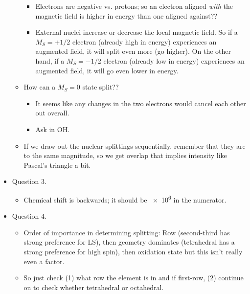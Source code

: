 \documentclass[../notes.tex]{subfiles}
\begin{document}
\begin{itemize}
\begin{itemize}
\begin{itemize}
            \item Electrons are negative vs. protons; so an electron aligned \emph{with} the magnetic field is higher in energy than one aligned against??
            \item External nuclei increase or decrease the local magnetic field. So if a $M_S=+1/2$ electron (already high in energy) experiences an augmented field, it will split even more (go higher). On the other hand, if a $M_S=-1/2$ electron (already low in energy) experiences an augmented field, it will go even lower in energy.
        \end{itemize}
        \item How can a $M_S=0$ state split??
        \begin{itemize}
            \item It seems like any changes in the two electrons would cancel each other out overall.
            \item Ask in OH.
        \end{itemize}
        \item If we draw out the nuclear splittings sequentially, remember that they are to the same magnitude, so we get overlap that implies intensity like Pascal's triangle a bit.
    \end{itemize}
    \item Question 3.
    \begin{itemize}
        \item Chemical shift is backwards; it should be \num{e6} in the numerator.
    \end{itemize}
    \item Question 4.
    \begin{itemize}
        \item Order of importance in determining splitting: Row (second-third has strong preference for LS), then geometry dominates (tetrahedral has a strong preference for high spin), then oxidation state but this isn't really even a factor.
        \item So just check (1) what row the element is in and if first-row, (2) continue on to check whether tetrahedral or octahedral.
    \end{itemize}
\end{itemize}
\end{document}
